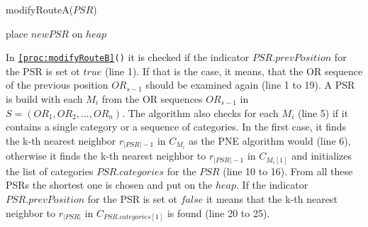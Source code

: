 \begin{procedure}[H]
\caption{modifyRouteA($PSR$)}
\label{proc:modifyRouteA}
	
		
	place $newPSR$ on $heap$\;
\end{procedure}

\pagebreak

In \texttt{\ref{proc:modifyRouteB}()} it is checked if the indicator $PSR.prevPosition$ for the PSR is set ot $true$ (line 1). If that is the case, it means, that the OR sequence of the previous position $OR_{s-1}$ should be examined again (line 1 to 19). A PSR is build with each $M_i$ from the OR sequences $OR_{s-1}$ in $S = (OR_1, OR_2, ..., OR_n)$. The algorithm also checks for each $M_i$ (line 5) if it contains a single category or a sequence of categories. In the first case, it finds the k-th nearest neighbor $r_{|PSR|-1}$ in $C_{M_{i}}$ as the PNE algorithm would (line 6), otherwise it finds the k-th nearest neighbor to $r_{|PSR|-1}$ in $C_{M_i[1]}$ and initializes the list of categories $PSR.categories$ for the $PSR$ (line 10 to 16). From all these PSRs the shortest one is chosen and put on the $heap$. 
If the indicator $PSR.prevPosition$ for the PSR is set ot $false$  it means that the k-th nearest neighbor to $r_{|PSR|}$ in $C_{PSR.categories[1]}$ is found (line 20 to 25).

